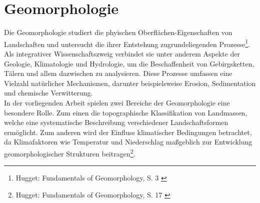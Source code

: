 
\section{Geomorphologie}

Die Geomorphologie studiert die phyischen Oberflächen-Eigenschaften von Landschaften und untersucht die ihrer Entstehung zugrundeliegenden Prozesse\footnote{
    Hugget: Fundamentals of Geomorphology, S. 3
    \cite{huggett2022fundamentals}
}. Als integrativer Wissenschaftszweig verbindet sie unter anderem Aspekte der Geologie, Klimatologie und Hydrologie, um die Beschaffenheit von Gebirgsketten, Tälern und allem dazwischen zu analysieren. Diese Prozesse umfassen eine Vielzahl natürlicher Mechanismen, darunter beispielsweise Erosion, Sedimentation und chemische Verwitterung. \\
In der vorliegenden Arbeit spielen zwei Bereiche der Geomorphologie eine besondere Rolle. Zum einen die topographische Klassifikation von Landmassen, welche eine systematische Beschreibung verschiedener Landschaftsformen ermöglicht. Zum anderen wird der Einfluss klimatischer Bedingungen betrachtet, da Klimafaktoren wie Temperatur und Niederschlag maßgeblich zur Entwicklung geomorphologischer Strukturen beitragen\footnote{
    Hugget: Fundamentals of Geomorphology, S. 17
    \cite{huggett2022fundamentals}
}.





